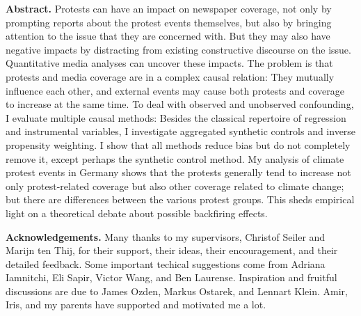 \textbf{Abstract.} Protests can have an impact on newspaper coverage, not only by prompting reports about the protest events themselves, but also by bringing attention to the issue that they are concerned with. But they may also have negative impacts by distracting from existing constructive discourse on the issue. Quantitative media analyses can uncover these impacts. The problem is that protests and media coverage are in a complex causal relation: They mutually influence each other, and external events may cause both protests and coverage to increase at the same time. To deal with observed and unobserved confounding, I evaluate multiple causal methods: Besides the classical repertoire of regression and instrumental variables, I investigate aggregated synthetic controls and inverse propensity weighting. I show that all methods reduce bias but do not completely remove it, except perhaps the synthetic control method. My analysis of climate protest events in Germany shows that the protests generally tend to increase not only protest-related coverage but also other coverage related to climate change; but there are differences between the various protest groups. This sheds empirical light on a theoretical debate about possible backfiring effects.

\textbf{Acknowledgements.} Many thanks to my supervisors, Christof Seiler and Marijn ten Thij, for their support, their ideas, their encouragement, and their detailed feedback. Some important techical suggestions come from Adriana Iamnitchi, Eli Sapir, Victor Wang, and Ben Laurense. Inspiration and fruitful discussions are due to James Ozden, Markus Ostarek, and Lennart Klein. Amir, Iris, and my parents have supported and motivated me a lot.

\newpage
